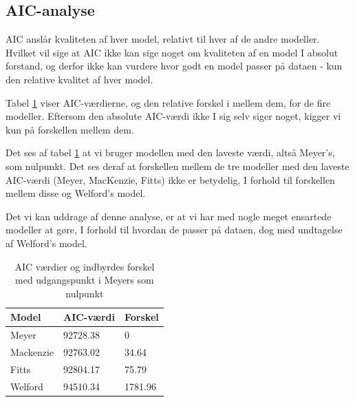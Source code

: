 \subsection*{AIC-analyse}
AIC anslår kvaliteten af hver model, relativt til hver af de andre modeller. Hvilket vil sige at AIC ikke kan sige noget om kvaliteten af en model I absolut forstand, og derfor ikke kan vurdere hvor godt en model passer på dataen - kun den relative kvalitet af hver model.

Tabel \ref{tab:table_analysis_aic1} viser AIC-værdierne, og den relative forskel i mellem dem, for de fire modeller. Eftersom den absolute AIC-værdi ikke I sig selv siger noget, kigger vi kun på forskellen mellem dem.

Det ses af tabel \ref{tab:table_analysis_aic1} at vi bruger modellen med den laveste værdi, altså Meyer's, som nulpunkt. Det ses deraf at forskellen mellem de tre modeller med den laveste AIC-værdi (Meyer, MacKenzie, Fitts) ikke er betydelig, I forhold til forskellen mellem disse og Welford's model.

Det vi kan uddrage af denne analyse, er at vi har med nogle meget ensartede modeller at gøre, I forhold til hvordan de passer på dataen, dog med undtagelse af Welford's model.

\begin{table}[h]
\centering
\begin{tabular}{lll}
Model 	  & AIC-værdi & Forskel\\\hline
Meyer 	  & 92728.38 & 0 \\
Mackenzie & 92763.02 & 34.64 \\
Fitts 	  & 92804.17 & 75.79 \\
Welford   & 94510.34 & 1781.96
\end{tabular}
\caption{AIC værdier og indbyrdes forskel med udgangspunkt i Meyers som nulpunkt}
\label{tab:table_analysis_aic1}
\end{table}

